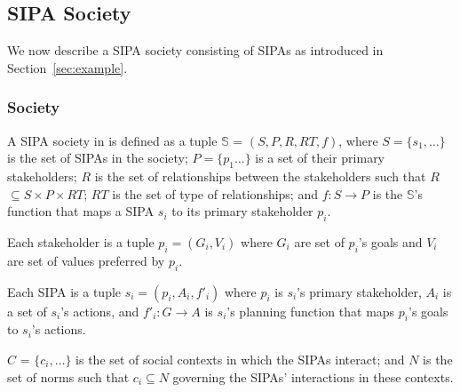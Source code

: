 \subsection{\frameworkAinur SIPA Society}
We now describe a SIPA society consisting of \locationapp SIPAs as introduced in Section~\ref{sec:example}. 

\subsubsection{Society} 

% 
A SIPA society in \frameworkAinur is defined as a tuple $\mathbb{S}$ = $(S, P, R, RT, f)$, where 
$S=\{s_1,\ldots\}$ is the set of SIPAs  in the society;  
$P=\{p_1\ldots\}$ is a set of their primary stakeholders; 
$R$ is the set of relationships between the stakeholders such that $R$ $\subseteq S\times P \times RT$; 
$RT$ is the set of type of relationships; 
and $f: S \rightarrow P$ is the $\mathbb{S}$'s function that maps a SIPA $s_i$ to its primary stakeholder $p_i$.

Each stakeholder is a tuple $p_i = (G_i, V_i)$ where $G_i$ are set of $p_i$'s goals and $V_i$ are set of values preferred by $p_i$.

Each SIPA is a tuple $s_i = (p_i, A_i, f'_i)$ where $p_i$ is $s_i$'s primary stakeholder, $A_i$ is a set of $s_i$'s actions, and $f'_i:  G \rightarrow A$ is $s_i$'s planning function that maps $p_i$'s goals to $s_i$'s actions.  

$C$ = $\{c_i, \ldots\}$ is the set of social contexts in which the SIPAs interact; 
and $N$ is the set of norms such that $c_i \subseteq N$ governing the SIPAs' interactions in these contexts. 
% 

